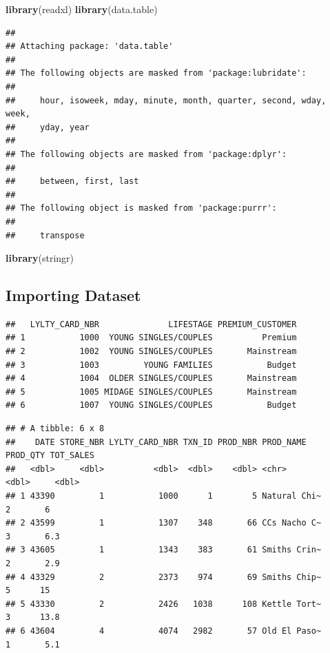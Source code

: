 \documentclass[
]{article}
\newenvironment{Shaded}{\begin{snugshade}}{\end{snugshade}}
\newcommand{\FunctionTok}[1]{\textcolor[rgb]{0.13,0.29,0.53}{\textbf{#1}}}
\newcommand{\NormalTok}[1]{#1}
\begin{document}
\begin{Shaded}
\begin{Highlighting}[]
\FunctionTok{library}\NormalTok{(readxl)}
\FunctionTok{library}\NormalTok{(data.table)}
\end{Highlighting}
\end{Shaded}

\begin{verbatim}
## 
## Attaching package: 'data.table'
## 
## The following objects are masked from 'package:lubridate':
## 
##     hour, isoweek, mday, minute, month, quarter, second, wday, week,
##     yday, year
## 
## The following objects are masked from 'package:dplyr':
## 
##     between, first, last
## 
## The following object is masked from 'package:purrr':
## 
##     transpose
\end{verbatim}

\begin{Shaded}
\begin{Highlighting}[]
\FunctionTok{library}\NormalTok{(stringr)}
\end{Highlighting}
\end{Shaded}

\hypertarget{importing-dataset}{%
\subsection{Importing Dataset}\label{importing-dataset}}

\begin{verbatim}
##   LYLTY_CARD_NBR              LIFESTAGE PREMIUM_CUSTOMER
## 1           1000  YOUNG SINGLES/COUPLES          Premium
## 2           1002  YOUNG SINGLES/COUPLES       Mainstream
## 3           1003         YOUNG FAMILIES           Budget
## 4           1004  OLDER SINGLES/COUPLES       Mainstream
## 5           1005 MIDAGE SINGLES/COUPLES       Mainstream
## 6           1007  YOUNG SINGLES/COUPLES           Budget
\end{verbatim}

\begin{verbatim}
## # A tibble: 6 x 8
##    DATE STORE_NBR LYLTY_CARD_NBR TXN_ID PROD_NBR PROD_NAME    PROD_QTY TOT_SALES
##   <dbl>     <dbl>          <dbl>  <dbl>    <dbl> <chr>           <dbl>     <dbl>
## 1 43390         1           1000      1        5 Natural Chi~        2       6  
## 2 43599         1           1307    348       66 CCs Nacho C~        3       6.3
## 3 43605         1           1343    383       61 Smiths Crin~        2       2.9
## 4 43329         2           2373    974       69 Smiths Chip~        5      15  
## 5 43330         2           2426   1038      108 Kettle Tort~        3      13.8
## 6 43604         4           4074   2982       57 Old El Paso~        1       5.1
\end{verbatim}
\end{document}
